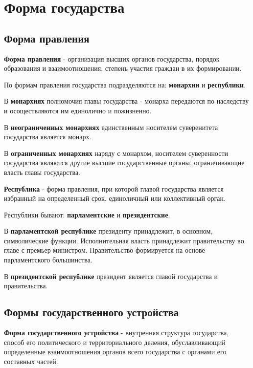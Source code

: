 \documentclass[a5paper,10pt]{article}
\begin{document}
	\section{Форма государства}
		\subsection{Форма правления}
			\textbf{Форма правления} - организация высших органов государства, порядок образования и взаимоотношения, степень участия граждан в их формировании.

			По формам правления государства подразделяются на: \textbf{монархии} и \textbf{республики}.

			В \textbf{монархиях} полномочия главы государства - монарха передаются по наследству и осоществляются им единолично и пожизненно.

			В \textbf{неограниченных монархиях} единственным носителем суверенитета государства является монарх.

			В \textbf{ограниченных монархиях} наряду с монархом, носителем суверенности государства являются другие высшие государственные органы, ограничивающие власть главы государства.

			\textbf{Республика} - форма правления, при которой главой государства является избранный на определенный срок, единоличный или коллективный орган.

			Республики бывают: \textbf{парламентские} и \textbf{президентские}.

			В \textbf{парламентской республике} президенту принадлежит, в основном, символические функции. Исполнительная власть принадлежит правительству во главе с премьер-министром. Правительство формируется на основе парламентского большинства.

			В \textbf{президентской республике} президент является главой государства и правительства.

		\subsection{Формы государственного устройства}
			\textbf{Форма государственного устройства} - внутренняя структура государства, способ его политического и территориального деления, обуславливающий определенные взаимоотношения органов всего государства с органами его составных частей.
\end{document}
